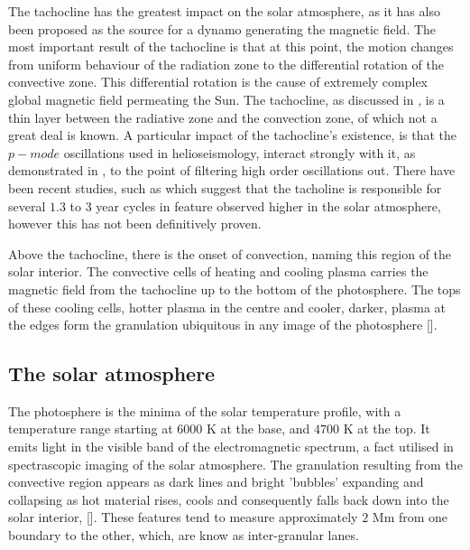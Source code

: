 The tachocline has the greatest impact on the solar atmosphere, as it has also been proposed as the source for a dynamo generating the magnetic field.
The most important result of the tachocline is that at this point, the motion changes from uniform behaviour of the radiation zone to the differential rotation of the convective zone.
This differential rotation is the cause of extremely complex global magnetic field permeating the Sun.
The tachocline, as discussed in \cite{Brun2001}, is a thin layer between the radiative zone and the convection zone, of which not a great deal is known.
A particular impact of the tachocline's existence, is that the $p-mode$ oscillations used in helioseismology, interact strongly with it, as demonstrated in \cite{Chaplin2014}, to the point of filtering high order oscillations out.
There have been recent studies, such as \cite{Obridko2007} which suggest that the tacholine is responsible for several $1.3$ to $3$ year cycles in feature observed higher in the solar atmosphere, however this has not been definitively proven.

Above the tachocline, there is the onset of convection, naming this region of the solar interior.
The convective cells of heating and cooling plasma carries the magnetic field from the tachocline up to the bottom of the photosphere.
The tops of these cooling cells, hotter plasma in the centre and cooler, darker, plasma at the edges form the granulation ubiquitous in any image of the photosphere [\cite{Nordlund2009}].


\subsection{The solar atmosphere}
The photosphere is the minima of the solar temperature profile, with a temperature range starting at $6000$ K at the base, and $4700$ K at the top.
It emits light in the visible band of the electromagnetic spectrum, a fact utilised in spectrascopic imaging of the solar atmosphere.
The granulation resulting from the convective region appears as dark lines and bright 'bubbles' expanding and collapsing as hot material rises, cools and consequently falls back down into the solar interior, [\cite{Nordlund2009}].
These features tend to measure approximately $2$ Mm from one boundary to the other, which, are know as inter-granular lanes.


